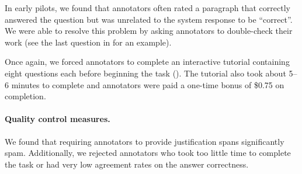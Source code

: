 In early pilots, we found that annotators often rated a paragraph that correctly answered the question but was unrelated to the system response to be ``correct''.
We were able to resolve this problem by asking annotators to double-check their work (see the last question in  for an example).

Once again, we forced annotators to complete an interactive tutorial containing eight questions each before beginning the task ().
The tutorial also took about 5--6 minutes to complete and annotators were paid a one-time bonus of \$0.75 on completion.

\paragraph{Quality control measures.}
We found that requiring annotators to provide justification spans significantly spam.
Additionally, we rejected annotators who took too little time to complete the task or had very low agreement rates on the answer correctness.

